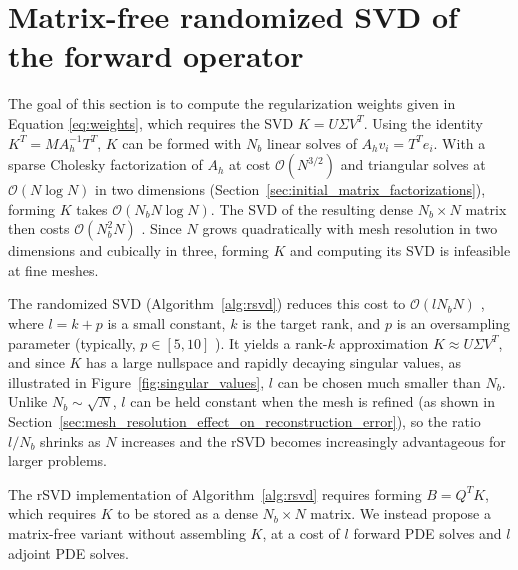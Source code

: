 \section{Matrix-free randomized SVD of the forward operator}
\label{sec:rsvd}


The goal of this section is to compute the regularization weights given in Equation \eqref{eq:weights}, which requires the SVD $K = U\Sigma V^T$. Using the identity $K^T = MA_h^{-1}T^T$, $K$ can be formed with $N_b$ linear solves of $A_h v_i = T^T e_i$. With a sparse Cholesky factorization of $A_h$ at cost $\mathcal{O}(N^{3/2})$ and triangular solves at $\mathcal{O}(N \log N)$ in two dimensions (Section~\ref{sec:initial_matrix_factorizations}), forming $K$ takes $\mathcal{O}(N_b N \log N)$. The SVD of the resulting dense $N_b \times N$ matrix then costs $\mathcal{O}(N_b^2 N)$ \cite{dongarraSingularValueDecomposition2018}. Since $N$ grows quadratically with mesh resolution in two dimensions and cubically in three, forming $K$ and computing its SVD is infeasible at fine meshes.

The randomized SVD (Algorithm~\ref{alg:rsvd}) reduces this cost to $\mathcal{O}(l N_b N)$ \cite{halkoFindingStructureRandomness2011}, where $l = k + p$ is a small constant, $k$ is the target rank, and $p$ is an oversampling parameter (typically, $p \in [5, 10]$ \cite{halkoFindingStructureRandomness2011}). It yields a rank-$k$ approximation $K \approx U \Sigma V^T$, and since $K$ has a large nullspace and rapidly decaying singular values, as illustrated in Figure~\ref{fig:singular_values}, $l$ can be chosen much smaller than $N_b$. Unlike $N_b \sim \sqrt{N}$, $l$ can be held constant when the mesh is refined (as shown in Section~\ref{sec:mesh_resolution_effect_on_reconstruction_error}), so the ratio $l / N_b$ shrinks as $N$ increases and the rSVD becomes increasingly advantageous for larger problems.

The rSVD implementation of Algorithm~\ref{alg:rsvd} requires forming $B = Q^T K$, which requires $K$ to be stored as a dense $N_b \times N$ matrix. We instead propose a matrix-free variant without assembling $K$, at a cost of $l$ forward PDE solves and $l$ adjoint PDE solves.


